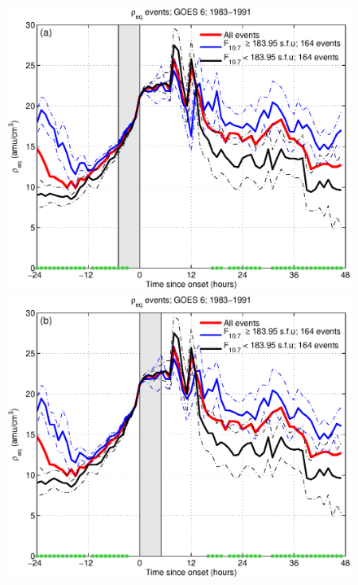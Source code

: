 \begin{figure}[tp!]
  \centering
  \includegraphics[scale=0.40]{2016SW001507R-p09a.eps}
  \includegraphics[scale=0.40]{2016SW001507R-p09b.eps}
\end{figure}
